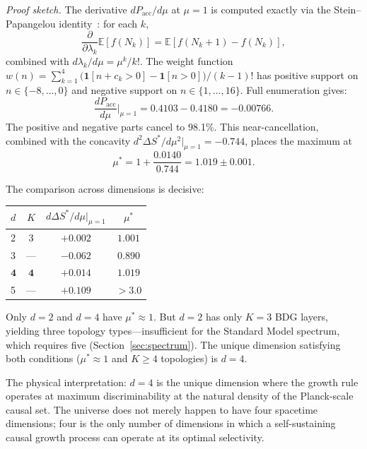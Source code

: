 \documentclass[12pt,a4paper]{article}
\begin{document}
\noindent\emph{Proof sketch.} The derivative $dP_{\mathrm{acc}}/d\mu$ at $\mu=1$ is computed exactly via the Stein--Papangelou identity~\cite{Stein1972,Papangelou1974}: for each $k$,
\begin{equation}
\frac{\partial}{\partial\lambda_k}\mathbb{E}[f(N_k)] = \mathbb{E}[f(N_k+1) - f(N_k)],
\label{eq:stein}
\end{equation}
combined with $d\lambda_k/d\mu = \mu^k/k!$. The weight function $w(n) = \sum_{k=1}^{4}\bigl(\mathbf{1}[n+c_k>0] - \mathbf{1}[n>0]\bigr)/(k\!-\!1)!$ has positive support on $n \in \{-8,\ldots,0\}$ and negative support on $n \in \{1,\ldots,16\}$. Full enumeration gives:
\begin{equation}
\frac{dP_{\mathrm{acc}}}{d\mu}\bigg|_{\mu=1} = 0.4103 - 0.4180 = -0.00766.
\label{eq:derivative}
\end{equation}
The positive and negative parts cancel to 98.1\%. This near-cancellation, combined with the concavity $d^2\Delta S^*/d\mu^2|_{\mu=1} = -0.744$, places the maximum at
\begin{equation}
\mu^* = 1 + \frac{0.0140}{0.744} = 1.019 \pm 0.001.
\label{eq:mu_star}
\end{equation}

The comparison across dimensions is decisive:
\begin{center}
\begin{tabular}{@{}lccc@{}}
\toprule
$d$ & $K$ & $d\Delta S^*/d\mu\big|_{\mu=1}$ & $\mu^*$ \\
\midrule
2 & 3 & $+0.002$ & $1.001$ \\
3 & --- & $-0.062$ & $0.890$ \\
$\mathbf{4}$ & $\mathbf{4}$ & $\mathbf{+0.014}$ & $\mathbf{1.019}$ \\
5 & --- & $+0.109$ & $>3.0$ \\
\bottomrule
\end{tabular}
\end{center}
Only $d=2$ and $d=4$ have $\mu^* \approx 1$. But $d=2$ has only $K=3$ BDG layers, yielding three topology types---insufficient for the Standard Model spectrum, which requires five (Section~\ref{sec:spectrum}). The unique dimension satisfying both conditions ($\mu^* \approx 1$ and $K \geq 4$ topologies) is $d=4$.

The physical interpretation: $d=4$ is the unique dimension where the growth rule operates at maximum discriminability at the natural density of the Planck-scale causal set. The universe does not merely happen to have four spacetime dimensions; four is the only number of dimensions in which a self-sustaining causal growth process can operate at its optimal selectivity.
\end{document}
